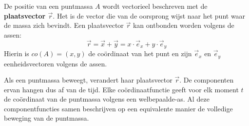 \documentclass{ximera}
\begin{document}
\begin{definition}
	De positie van een puntmassa \(A\) wordt vectorieel beschreven met de \textbf{plaatsvector \(\vec{r}\)}. Het is de vector die van de oorsprong wijst naar het punt waar de massa zich bevindt. %
	Een plaatsvector \(\vec{r}\) kan ontbonden worden volgens de assen:
	\[
		\vec{r} = \vec{x} + \vec{y} = x\cdot\vec{e}_x + y\cdot\vec{e}_y	
	\]
	Hierin is \(co(A) = (x,y)\) de coördinaat van het punt en zijn $\vec{e}_x$ en $\vec{e}_y$ eenheidsvectoren volgens de assen.

\begin{image}[0.3\textwidth]
\end{image}
\end{definition}


Als een puntmassa beweegt, verandert haar plaatsvector \(\vec{r}\). De componenten ervan hangen dus af van de tijd. Elke coördinaatfunctie geeft voor elk moment \(t\) de coördinaat van de puntmassa volgens een welbepaalde-as. Al deze componentfuncties samen beschrijven op een equivalente manier de volledige beweging van de puntmassa. 
\end{document}
